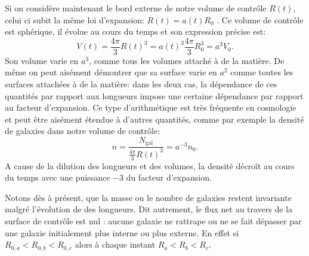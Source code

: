Si on considère maintenant le bord externe de notre volume de contrôle $R(t)$, celui ci subit la même loi d'expansion: $R(t)=a(t)R_0$ . Ce volume de contrôle est sphérique, il évolue au cours du temps et son expression précise est:
\begin{equation}
V(t)=\frac{4\pi}{3} R(t)^3 = a(t)^3\frac{4\pi}{3} R_0^3= a^3 V_0.
\end{equation}
Son volume varie en $a^3$, comme tous les volumes attaché à de la matière. De même on peut aisément démontrer que sa surface varie en $a^2$ comme toutes les surfaces attachées à de la matière: dans les deux cas, la dépendance de ces quantités par rapport aux longueurs impose une certaine dépendance par rapport au facteur d'expansion. Ce type d'arithmétique est très fréquente en cosmologie et peut être aisément étendue à d'autres quantités, comme par exemple la densité de galaxies dans notre volume de contrôle:
\begin{equation}
n=\frac{N_\mathrm{gal}}{\frac{4\pi}{3} R(t)^3}=a^{-3} n_0.
\end{equation}
A cause de la dilution des longueurs et des volumes, la densité décroît au cours du temps avec une puissance $-3$ du facteur d'expansion. 

Notons dès à présent, que la masse ou le nombre de galaxies restent invariante malgré l'évolution de des longueurs. Dit autrement, le flux net au travers de la surface de contrôle est nul : aucune galaxie ne rattrape ou ne se fait dépasser par une galaxie initialement plus interne ou plus externe. En effet si $R_{0,a}<R_{0,b}<R_{0,c}$ alors à chaque instant $R_a<R_b<R_c$.

